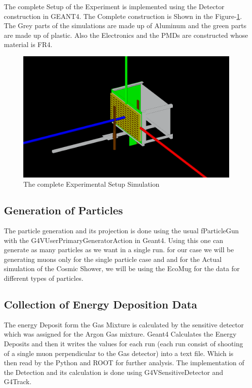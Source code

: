 \documentclass{article}
\begin{document}
\begin{multicols}{2}
The complete Setup of the Experiment is implemented using the Detector
construction in GEANT4. The Complete construction is Shown in the 
Figure-\ref{combsetup}. The Grey parts of the simulations are made up
of Aluminum and the green parts are made up of plastic. Also the Electronics and
the PMDs are constructed whose material is FR4.

\begin{figure}[H]
    \centering	
     \includegraphics[width=\columnwidth]{combsetup.png}
     \caption{The complete Experimental Setup Simulation}
     \label{combsetup}
\end{figure}





\subsection{Generation of Particles}

The particle generation and its projection is done using the
usual fParticleGun with the G4VUserPrimaryGeneratorAction in Geant4.
Using this one can generate as many particles as we want in a single run.
for our case we will be generating muons only for the single particle case and
and for the Actual simulation of the Cosmic Shower, we will be using the
EcoMug for the data for different types of particles.




\subsection{Collection of Energy Deposition Data}
The energy Deposit form the Gas Mixture is calculated by the 
sensitive detector which was assigned for the Argon Gas mixture.
Geant4 Calculates the Energy Deposits and then it writes the values
for each run (each run consist of shooting of a single muon perpendicular to the 
Gas detector) into a text file. Which is then read by the Python and ROOT for further analysis.
The implementation  of the Detection and its calculation is 
done using G4VSensitiveDetector and G4Track.



\end{multicols}
\end{document}
